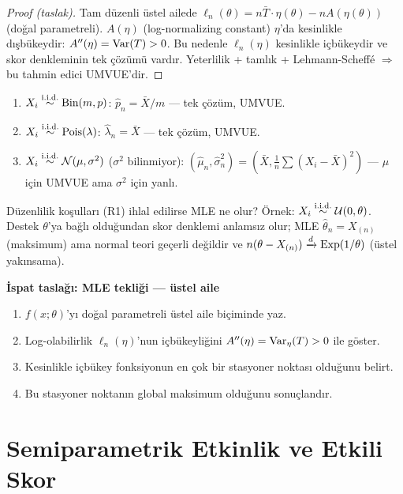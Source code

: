 \begin{proof}[Proof (taslak)]
Tam düzenli üstel ailede $\ell_n(\theta)=n\bar T\cdot\eta(\theta)-nA(\eta(\theta))$ (doğal parametreli). $A(\eta)$ (log-normalizing constant) $\eta$'da kesinlikle dışbükeydir: $A''(\eta)=\operatorname{Var}(T)>0$. Bu nedenle $\ell_n(\eta)$ kesinlikle içbükeydir ve skor denkleminin tek çözümü vardır. Yeterlilik + tamlık + Lehmann-Scheffé $\Rightarrow$ bu tahmin edici UMVUE'dir.
\end{proof}

\begin{ornek}\label{ex:ustel_mle}
\begin{enumerate}
  \item $X_i\overset{\text{i.i.d.}}{\sim}\operatorname{Bin}(m,p)$: $\hat p_n=\bar X/m$ --- tek çözüm, UMVUE.
  \item $X_i\overset{\text{i.i.d.}}{\sim}\operatorname{Pois}(\lambda)$: $\hat\lambda_n=\bar X$ --- tek çözüm, UMVUE.
  \item $X_i\overset{\text{i.i.d.}}{\sim}\mathcal{N}(\mu,\sigma^2)$ ($\sigma^2$ bilinmiyor): $(\hat\mu_n,\hat\sigma^2_n)=(\bar X,\frac1n\sum(X_i-\bar X)^2)$ --- $\mu$ için UMVUE ama $\sigma^2$ için yanlı.
\end{enumerate}
\end{ornek}

\begin{kritiksorgu}
Düzenlilik koşulları (R1) ihlal edilirse MLE ne olur? Örnek: $X_i\overset{\text{i.i.d.}}{\sim}\mathcal{U}(0,\theta)$. Destek $\theta$'ya bağlı olduğundan skor denklemi anlamsız olur; MLE $\hat\theta_n=X_{(n)}$ (maksimum) ama normal teori geçerli değildir ve $n(\theta-X_{(n)})\xrightarrow{d}\operatorname{Exp}(1/\theta)$ (üstel yakınsama).
\end{kritiksorgu}

\begin{ispatiskele}
\textbf{İspat taslağı: MLE tekliği --- üstel aile}
\begin{enumerate}
  \item $f(x;\theta)$'yı doğal parametreli üstel aile biçiminde yaz.
  \item Log-olabilirlik $\ell_n(\eta)$'nun içbükeyliğini $A''(\eta)=\operatorname{Var}_\eta(T)>0$ ile göster.
  \item Kesinlikle içbükey fonksiyonun en çok bir stasyoner noktası olduğunu belirt.
  \item Bu stasyoner noktanın global maksimum olduğunu sonuçlandır.
\end{enumerate}
\end{ispatiskele}

\section{Semiparametrik Etkinlik ve Etkili Skor}
\label{sec:semiparametrik}

